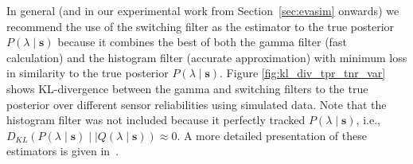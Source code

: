 In general (and in our experimental work from Section~\ref{sec:evasim} onwards) we recommend the use of the switching filter as the estimator to the true posterior $P(\lambda \mid \mathbf{s})$ because it combines the best of both the gamma filter (fast calculation) and the histogram filter (accurate approximation) with minimum loss in similarity to the true posterior $P(\lambda \mid \mathbf{s})$. Figure \ref{fig:kl_div_tpr_tnr_var} shows KL-divergence between the gamma and switching filters to the true posterior over different sensor reliabilities using simulated data. Note that the histogram filter was not included because it perfectly tracked $P(\lambda \mid \mathbf{s})$, i.e., $D_{KL}(P(\lambda \mid \mathbf{s}) \mid \mid Q(\lambda \mid \mathbf{s})) \approx 0$. A more detailed presentation of these estimators is given in~\cite{jovan18a}.